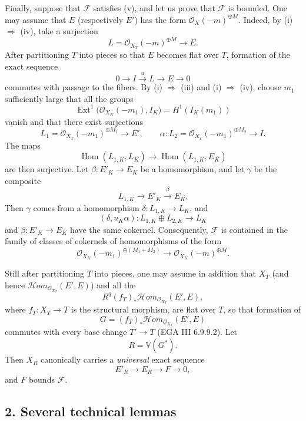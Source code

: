 Finally, suppose that \(\mathcal F\) satisfies (v), and let us prove that
\(\mathcal F\) is bounded. One may assume that \(E\) (respectively \(E'\))
has the form \(\mathcal O_X(-m)^{\oplus M}\). Indeed,
by (i) \(\Rightarrow\) (iv), take a surjection
\[
L=\mathcal O_{X_T}(-m)^{\oplus M}\longrightarrow E.
\]
After partitioning \(T\) into pieces so that \(E\) becomes flat over \(T\),
formation of the exact sequence
\[
0\longrightarrow I\xrightarrow{u}L\longrightarrow E\longrightarrow0
\]
commutes with passage to the fibers. By (i) \(\Rightarrow\) (iii) and
(i) \(\Rightarrow\) (iv), choose \(m_1\) sufficiently large that all the
groups
\[
\operatorname{Ext}^1\bigl(\mathcal O_{X_K}(-m_1),I_K\bigr)
=H^1(I_K(m_1))
\]
vanish and that there exist surjections
\[
L_1=\mathcal O_{X_T}(-m_1)^{\oplus M_1}\longrightarrow E',
\qquad
\alpha:L_2=\mathcal O_{X_T}(-m_1)^{\oplus M_2}\longrightarrow I.
\]
The maps
\[
\operatorname{Hom}(L_{1,K},L_K)\longrightarrow
\operatorname{Hom}(L_{1,K},E_K)
\]
are then surjective. Let \(\beta:E'_K\to E_K\) be a homomorphism, and let
\(\gamma\) be the composite
\[
L_{1,K}\longrightarrow E'_K\xrightarrow{\beta}E_K.
\]
Then \(\gamma\) comes from a homomorphism
\(\delta:L_{1,K}\to L_K\), and
\[
(\delta,u_K\alpha):L_{1,K}\oplus L_{2,K}\longrightarrow L_K
\]
and \(\beta:E'_K\to E_K\) have the same cokernel. Consequently,
\(\mathcal F\) is contained in the family of classes of cokernels of
homomorphisms of the form
\[
\mathcal O_{X_K}(-m_1)^{\oplus(M_1+M_2)}
\longrightarrow
\mathcal O_{X_K}(-m)^{\oplus M}.
\]

Still after partitioning \(T\) into pieces, one may assume in addition
that \(X_T\) (and hence
\(\mathcal H\!om_{\mathcal O_{X_T}}(E',E)\)) and all the
\[
R^q(f_T)_*\mathcal H\!om_{\mathcal O_{X_T}}(E',E),
\]
where \(f_T:X_T\to T\) is the structural morphism, are flat over \(T\),
so that formation of
\[
G=(f_T)_*\mathcal H\!om_{\mathcal O_{X_T}}(E',E)
\]
commutes with every base change \(T'\to T\) (EGA III 6.9.9.2). Let
\[
R=\mathbb V(G^*).
\]
Then \(X_R\) canonically carries a \emph{universal} exact sequence
\[
E'_R\longrightarrow E_R\longrightarrow F\longrightarrow0,
\]
and \(F\) bounds \(\mathcal F\).

\subsection*{2. Several technical lemmas}

